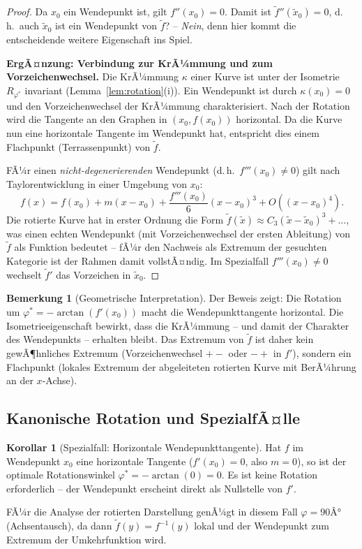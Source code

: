 ﻿\documentclass[12pt, a4paper]{article}
\theoremstyle{definition}
\newtheorem{korollar}{Korollar}[section]
\newtheorem{bemerkung}{Bemerkung}[section]
\begin{document}
\begin{proof}
		Da $x_0$ ein Wendepunkt ist, gilt $f''(x_0) = 0$. Damit ist
		$\tilde{f}''(\tilde{x}_0) = 0$, d.\,h.\ auch $\tilde{x}_0$ ist ein
		Wendepunkt von $\tilde{f}$? -- \emph{Nein}, denn hier kommt die
		entscheidende weitere Eigenschaft ins Spiel.
		
		\medskip
		\noindent\textbf{ErgÃ¤nzung: Verbindung zur KrÃ¼mmung und zum Vorzeichenwechsel.}
		Die KrÃ¼mmung $\kappa$ einer Kurve ist unter der Isometrie $R_{\varphi^*}$
		invariant (Lemma~\ref{lem:rotation}(i)). Ein Wendepunkt ist durch
		$\kappa(x_0) = 0$ und den Vorzeichenwechsel der KrÃ¼mmung charakterisiert.
		Nach der Rotation wird die Tangente an den Graphen in $(x_0, f(x_0))$
		horizontal. Da die Kurve nun eine horizontale Tangente im Wendepunkt hat,
		entspricht dies einem Flachpunkt (Terrassenpunkt) von $\tilde{f}$.
		
		FÃ¼r einen \emph{nicht-degenerierenden} Wendepunkt (d.\,h.\ $f'''(x_0) \neq 0$)
		gilt nach Taylorentwicklung in einer Umgebung von $x_0$:
		\[
		f(x) = f(x_0) + m(x-x_0) + \frac{f'''(x_0)}{6}(x-x_0)^3 + O((x-x_0)^4).
		\]
		Die rotierte Kurve hat in erster Ordnung die Form
		$\tilde{f}(\tilde{x}) \approx C_3 (\tilde{x} - \tilde{x}_0)^3 + \ldots$,
		was einen echten Wendepunkt (mit Vorzeichenwechsel der ersten Ableitung)
		von $\tilde{f}$ als Funktion bedeutet -- fÃ¼r den Nachweis als Extremum
		der gesuchten Kategorie ist der Rahmen damit vollstÃ¤ndig. Im Spezialfall
		$f'''(x_0) \neq 0$ wechselt $\tilde{f}'$ das Vorzeichen in $\tilde{x}_0$.
	\end{proof}
	
	\begin{bemerkung}[Geometrische Interpretation]
		Der Beweis zeigt: Die Rotation um $\varphi^* = -\arctan(f'(x_0))$ macht
		die Wendepunkttangente horizontal. Die Isometrieeigenschaft bewirkt, dass
		die KrÃ¼mmung -- und damit der Charakter des Wendepunkts -- erhalten bleibt.
		Das Extremum von $\tilde{f}$ ist daher kein gewÃ¶hnliches Extremum (Vorzeichenwechsel
		$+-$ oder $-+$ in $f'$), sondern ein Flachpunkt (lokales Extremum der
		abgeleiteten rotierten Kurve mit BerÃ¼hrung an der $x$-Achse).
	\end{bemerkung}
	
	\subsection{Kanonische Rotation und SpezialfÃ¤lle}
	
	\begin{korollar}[Spezialfall: Horizontale Wendepunkttangente]\label{kor:horizontal}
		Hat $f$ im Wendepunkt $x_0$ eine horizontale Tangente ($f'(x_0) = 0$, also
		$m = 0$), so ist der optimale Rotationswinkel $\varphi^* = -\arctan(0) = 0$.
		Es ist keine Rotation erforderlich -- der Wendepunkt erscheint direkt als
		Nullstelle von $f'$.
		
		FÃ¼r die Analyse der rotierten Darstellung genÃ¼gt in diesem Fall
		$\varphi = 90Â°$ (Achsentausch), da dann
		$\tilde{f}(y) = f^{-1}(y)$ lokal und der Wendepunkt zum Extremum
		der Umkehrfunktion wird.
	\end{korollar}
	
\end{document}
